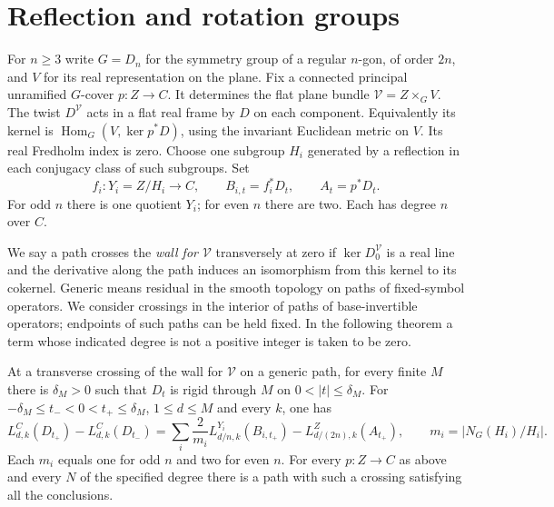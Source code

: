\section{Reflection and rotation groups}\label{sec:groups}
For $n\ge3$ write $G=D_n$ for the symmetry group of a regular
$n$-gon, of order $2n$, and $V$ for its real representation on the
plane. Fix a connected principal unramified $G$-cover $p:Z\to C$.
It determines the flat plane bundle $\mathcal V=Z\times_G V$.
The twist $D^{\mathcal V}$ acts in a flat real frame by $D$ on each
component. Equivalently its kernel is
$\operatorname{Hom}_G(V,\ker p^*D)$, using the invariant Euclidean
metric on $V$. Its real Fredholm index is zero. Choose one subgroup
$H_i$ generated by a reflection in each conjugacy class of such
subgroups. Set
\[
    f_i:Y_i=Z/H_i\longrightarrow C,\qquad
    B_{i,t}=f_i^*D_t,\qquad A_t=p^*D_t.
\]
For odd $n$ there is one quotient $Y_i$; for even $n$ there are two.
Each has degree $n$ over $C$.

We say a path crosses the \emph{wall for $\mathcal V$} transversely
at zero if $\ker D_0^{\mathcal V}$ is a real line and the derivative
along the path induces an isomorphism from this kernel to its
cokernel. Generic means residual in the smooth topology on paths of
fixed-symbol operators. We consider crossings in the interior of
paths of base-invertible operators; endpoints of such paths can be
held fixed. In the following theorem a term whose indicated degree
is not a positive integer is taken to be zero.

\begin{theorem}\label{thm:dihedral}
At a transverse crossing of the wall for $\mathcal V$ on a generic
path, for every finite $M$ there is $\delta_M>0$ such that $D_t$ is
rigid through $M$ on $0<|t|\le\delta_M$. For
$-\delta_M\le t_-<0<t_+\le\delta_M$, $1\le d\le M$ and every $k$,
one has
\begin{equation}\label{eq:main}
  L^C_{d,k}(D_{t_+})-L^C_{d,k}(D_{t_-})
  =\sum_i \frac{2}{m_i} L^{Y_i}_{d/n,k}(B_{i,t_+})
           -L^Z_{d/(2n),k}(A_{t_+}), \qquad
              m_i=|N_G(H_i)/H_i|.
\end{equation}
Each $m_i$ equals one for odd $n$ and two for even $n$.
For every $p:Z\to C$ as above and every $N$ of the specified degree
there is a path with such a crossing satisfying all the conclusions.
\end{theorem}


